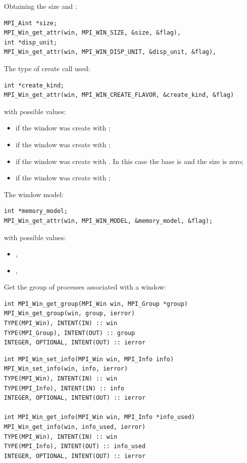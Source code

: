 Obtaining the size and :
\begin{lstlisting}
MPI_Aint *size;
MPI_Win_get_attr(win, MPI_WIN_SIZE, &size, &flag), 
int *disp_unit;
MPI_Win_get_attr(win, MPI_WIN_DISP_UNIT, &disp_unit, &flag), 
\end{lstlisting}

The type of create call used:
\begin{lstlisting}
int *create_kind;
MPI_Win_get_attr(win, MPI_WIN_CREATE_FLAVOR, &create_kind, &flag)
\end{lstlisting}
with possible values:
\begin{itemize}
\item {} if the window was create
  with ;
\item {} if the window was create
  with ;
\item {} if the window was create
  with . In this case the base is
   and the size is zero;
\item {} if the window was create
  with ;
\end{itemize}

The window model:
\begin{lstlisting}
int *memory_model;
MPI_Win_get_attr(win, MPI_WIN_MODEL, &memory_model, &flag);
\end{lstlisting}
with possible values:
\begin{itemize}
\item {},
\item {},
\end{itemize}

Get the group of processes associated with a window:
\begin{verbatim}
int MPI_Win_get_group(MPI_Win win, MPI_Group *group) 
MPI_Win_get_group(win, group, ierror) 
TYPE(MPI_Win), INTENT(IN) :: win 
TYPE(MPI_Group), INTENT(OUT) :: group 
INTEGER, OPTIONAL, INTENT(OUT) :: ierror
\end{verbatim}

\begin{verbatim}
int MPI_Win_set_info(MPI_Win win, MPI_Info info)
MPI_Win_set_info(win, info, ierror)
TYPE(MPI_Win), INTENT(IN) :: win
TYPE(MPI_Info), INTENT(IN) :: info
INTEGER, OPTIONAL, INTENT(OUT) :: ierror

int MPI_Win_get_info(MPI_Win win, MPI_Info *info_used)
MPI_Win_get_info(win, info_used, ierror)
TYPE(MPI_Win), INTENT(IN) :: win
TYPE(MPI_Info), INTENT(OUT) :: info_used
INTEGER, OPTIONAL, INTENT(OUT) :: ierror
\end{verbatim}

